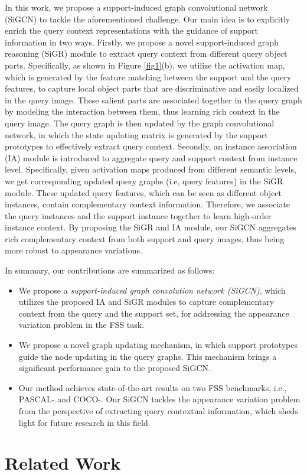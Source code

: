 \documentclass{bmvc2k}
\begin{document}
In this work, we propose a support-induced graph convolutional network (SiGCN) to tackle the aforementioned challenge. Our main idea is to explicitly enrich the query context representations with the guidance of support information in two ways. Firstly, we propose a novel support-induced graph reasoning (SiGR) module to extract query context from different query object parts. Specifically, as shown in Figure \ref{fig1}(b), we utilize the activation map, which is generated by the feature matching between the support and the query features, to capture local object parts that are discriminative and easily localized in the query image. These salient parts are associated together in the query graph by modeling the interaction between them, thus learning rich context in the query image. The query graph is then updated by the graph convolutional network, in which the state updating matrix is generated by the support prototypes to effectively extract query context. Secondly, an instance association (IA) module is introduced to aggregate query and support context from instance level. Specifically, given activation maps produced from different semantic levels, we  get corresponding updated query graphs (i.e, query features) in the SiGR module. These updated query features, which can be seen as different object instances, contain complementary context information. Therefore, we associate the query instances and the support instance together to learn high-order instance context. By proposing the SiGR and IA module, our SiGCN aggregates rich complementary context from both support and query images, thus being more robust to appearance variations.

In summary, our contributions are summarized as follows:
\begin{itemize}
\item We propose a \emph{support-induced graph convolution network (SiGCN)}, which utilizes the proposed IA and SiGR modules to capture complementary context from the query and the support set, for addressing the appearance variation problem in the FSS task. 

\item We propose a novel graph updating mechanism, in which support prototypes guide the node updating in the query graphs. This mechanism brings a significant performance gain to the proposed SiGCN.

\item Our method achieves state-of-the-art results on two FSS benchmarks, i.e., PASCAL- and COCO-. Our SiGCN tackles the appearance variation problem from the perspective of extracting query contextual information, which sheds light for future research in this field. 

\end{itemize} \section{Related Work}
\end{document}
